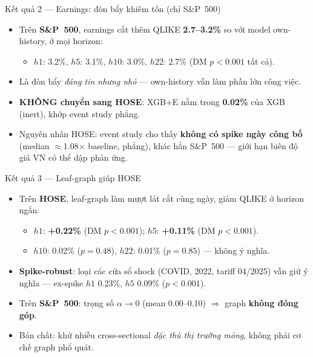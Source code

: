 \documentclass[aspectratio=169]{beamer}
\begin{document}
\begin{frame}{Kết quả 2 --- Earnings: đòn bẩy khiêm tốn (chỉ S\&P~500)}
  \begin{itemize}
    \item Trên \textbf{S\&P~500}, earnings cắt thêm QLIKE \textbf{2.7--3.2\%} so với model own-history, ở mọi horizon:
      \begin{itemize}
        \item $h1$: 3.2\%, \; $h5$: 3.1\%, \; $h10$: 3.0\%, \; $h22$: 2.7\% \; (DM $p<0.001$ tất cả).
      \end{itemize}
    \item Là đòn bẩy \emph{đáng tin nhưng nhỏ} --- own-history vẫn làm phần lớn công việc.
    \item \textbf{KHÔNG chuyển sang HOSE}: XGB+E nằm trong \textbf{0.02\%} của XGB (inert), khớp event study phẳng.
    \item Nguyên nhân HOSE: event study cho thấy \textbf{không có spike ngày công bố} (median $\approx$1.08$\times$ baseline, phẳng), khác hẳn S\&P~500 --- giới hạn biên độ giá VN có thể dập phản ứng.
  \end{itemize}
\end{frame}

\begin{frame}{Kết quả 3 --- Leaf-graph giúp HOSE}
  \begin{itemize}
    \item Trên \textbf{HOSE}, leaf-graph làm mượt lát cắt cùng ngày, giảm QLIKE ở horizon ngắn:
      \begin{itemize}
        \item $h1$: \textbf{+0.22\%} (DM $p<0.001$); \; $h5$: \textbf{+0.11\%} (DM $p<0.001$).
        \item $h10$: 0.02\% ($p=0.48$), \; $h22$: 0.01\% ($p=0.85$) --- không ý nghĩa.
      \end{itemize}
    \item \textbf{Spike-robust}: loại các cửa sổ shock (COVID, 2022, tariff 04/2025) vẫn giữ ý nghĩa --- ex-spike $h1$ 0.23\%, $h5$ 0.09\% ($p<0.001$).
    \item Trên \textbf{S\&P~500}: trọng số $\alpha \to 0$ (mean 0.00--0.10) $\Rightarrow$ graph \textbf{không đóng góp}.
    \item Bản chất: khử nhiễu cross-sectional \emph{đặc thù thị trường mỏng}, không phải cơ chế graph phổ quát.
  \end{itemize}
\end{frame}
\end{document}
